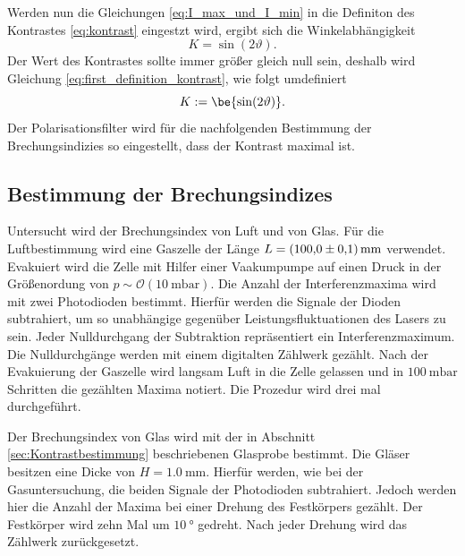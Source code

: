 Werden nun die Gleichungen \eqref{eq:I_max_und_I_min} in die Definiton des Kontrastes \eqref{eq:kontrast}
eingestzt wird, ergibt sich die Winkelabhängigkeit
\begin{equation}
  \label{eq:first_definition_kontrast}
  K=\sin(2\vartheta).
\end{equation}
Der Wert des Kontrastes sollte immer größer gleich null sein, deshalb wird Gleichung \eqref{eq:first_definition_kontrast},
wie folgt umdefiniert
\begin{equation}
  \label{eq:definition_dontrast}
  K:=\be{\sin(2\vartheta)}.
\end{equation}
Der Polarisationsfilter wird für die nachfolgenden Bestimmung der Brechungsindizies
so eingestellt, dass der Kontrast maximal ist.
\subsection{Bestimmung der Brechungsindizes}
Untersucht wird der Brechungsindex von Luft und von Glas.
Für die Luftbestimmung wird eine Gaszelle der Länge $L=\SI{100\pm0.1}{\milli\meter}$
verwendet. Evakuiert wird die Zelle mit Hilfer einer Vaakumpumpe auf einen
Druck in der Größenordung von $p\sim\mathcal{O}(\SI{10}{\milli\bar})$.
Die Anzahl der Interferenzmaxima wird mit zwei Photodioden bestimmt.
Hierfür werden die Signale der Dioden subtrahiert, um so unabhängige gegenüber
Leistungsfluktuationen des Lasers zu sein. Jeder Nulldurchgang der Subtraktion
repräsentiert ein Interferenzmaximum. Die Nulldurchgänge werden mit einem digitalten
Zählwerk gezählt. Nach der Evakuierung der Gaszelle wird langsam Luft in die Zelle
gelassen und in $\SI{100}{\milli\bar}$ Schritten die gezählten Maxima notiert. Die Prozedur wird
drei mal durchgeführt.

Der Brechungsindex von Glas wird mit der in Abschnitt \ref{sec:Kontrastbestimmung}
beschriebenen Glasprobe bestimmt. Die Gläser besitzen eine Dicke von $H=\SI{1.0}{\milli\meter}$.
Hierfür werden, wie bei der Gasuntersuchung,
die beiden Signale der Photodioden subtrahiert. Jedoch werden hier die Anzahl der Maxima
bei einer Drehung des Festkörpers gezählt. Der Festkörper wird zehn Mal um
$\SI{10}{\degree}$ gedreht. Nach jeder Drehung wird das Zählwerk zurückgesetzt.
